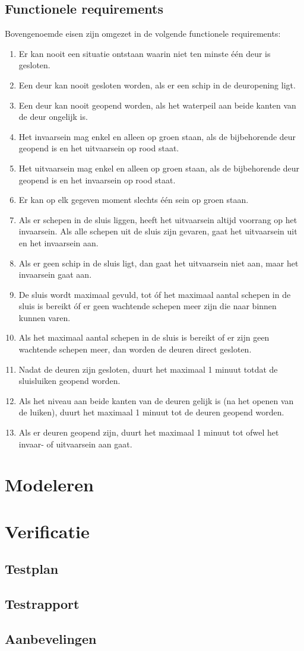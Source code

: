 \documentclass{article} %
\begin{document}
\subsection{Functionele requirements}
Bovengenoemde eisen zijn omgezet in de volgende functionele requirements:
\begin{enumerate}
    \item Er kan nooit een situatie ontstaan waarin niet ten minste één deur is gesloten.
    \item Een deur kan nooit gesloten worden, als er een schip in de deuropening ligt.
    \item Een deur kan nooit geopend worden, als het waterpeil aan beide kanten van de deur ongelijk is.
    \item Het invaarsein mag enkel en alleen op groen staan, als de bijbehorende deur geopend is en het uitvaarsein op rood staat.
    \item Het uitvaarsein mag enkel en alleen op groen staan, als de bijbehorende deur geopend is en het invaarsein op rood staat.
    \item Er kan op elk gegeven moment slechts één sein op groen staan.
    \item Als er schepen in de sluis liggen, heeft het uitvaarsein altijd voorrang op het invaarsein. Als alle schepen uit de sluis zijn gevaren, gaat het uitvaarsein uit en het invaarsein aan.
    \item Als er geen schip in de sluis ligt, dan gaat het uitvaarsein niet aan, maar het invaarsein gaat aan.
    \item De sluis wordt maximaal gevuld, tot óf het maximaal aantal schepen in de sluis is bereikt óf er geen wachtende schepen meer zijn die naar binnen kunnen varen.
    \item Als het maximaal aantal schepen in de sluis is bereikt of er zijn geen wachtende schepen meer, dan worden de deuren direct gesloten.
    \item Nadat de deuren zijn gesloten, duurt het maximaal 1 minuut totdat de sluisluiken geopend worden.
    \item Als het niveau aan beide kanten van de deuren gelijk is (na het openen van de luiken), duurt het maximaal 1 minuut tot de deuren geopend worden.
    \item Als er deuren geopend zijn, duurt het maximaal 1 minuut tot ofwel het invaar- of uitvaarsein aan gaat.
\end{enumerate}
\newpage

\section{Modeleren}
\newpage

\section{Verificatie}
\subsection{Testplan}
\subsection{Testrapport}
\subsection{Aanbevelingen}
\newpage


\printbibliography
\end{document}
